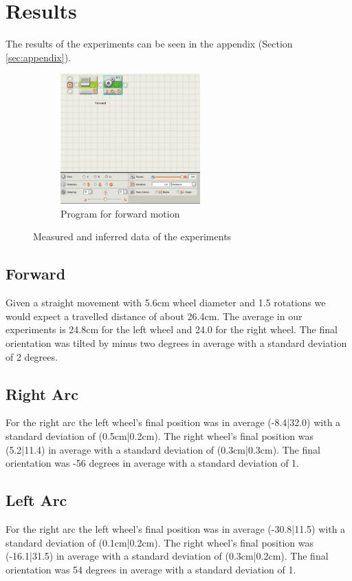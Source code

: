 \documentclass[paper=a4, fontsize=11pt]{scrartcl} %
\numberwithin{equation}{section} %
\numberwithin{figure}{section} %
\numberwithin{table}{section} %
\begin{document}
\section{Results}
The results of the experiments can be seen in the appendix (Section \ref{sec:appendix}).

\begin{figure}[h]
 
\begin{subfigure}{0.5\textwidth}
\includegraphics[width=0.9\linewidth, height=5cm]{forward_code.PNG} 
\caption{Program for forward motion}
\label{fig:sub_data}
\end{subfigure} 
\caption{Measured and inferred data of the experiments}
\label{fig:result}
\end{figure}


\subsection{Forward}
Given a straight movement with 5.6cm wheel diameter and 1.5 rotations we would expect a travelled distance of about 26.4cm.
The average in our experiments is 24.8cm for the left wheel and 24.0 for the right wheel.
The final orientation was tilted by minus two degrees in average with a standard deviation of 2 degrees.


\subsection{Right Arc}
For the right arc the left wheel's final position was in average (-8.4|32.0) with a standard deviation of (0.5cm|0.2cm).
The right wheel's final position was (5.2|11.4) in average with a standard deviation of (0.3cm|0.3cm).
The final orientation was -56 degrees in average with a standard deviation of 1.

\subsection{Left Arc}
For the right arc the left wheel's final position was in average (-30.8|11.5) with a standard deviation of (0.1cm|0.2cm).
The right wheel's final position was (-16.1|31.5) in average with a standard deviation of (0.3cm|0.2cm).
The final orientation was 54 degrees in average with a standard deviation of 1.
\end{document}
